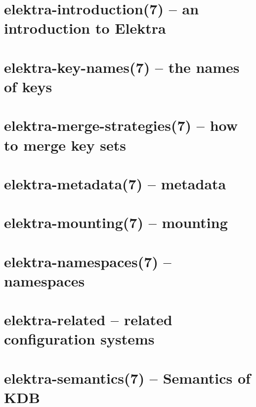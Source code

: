\let\mypdfximage\pdfximage\def\pdfximage{\immediate\mypdfximage}\documentclass[twoside]{book}
\newcommand{\+}{\discretionary{\mbox{\scriptsize$\hookleftarrow$}}{}{}}
\begin{document}
\chapter{elektra-\/introduction(7) -- an introduction to Elektra}
\label{doc_help_elektra-introduction_md}

\chapter{elektra-\/key-\/names(7) -- the names of keys}
\label{doc_help_elektra-key-names_md}

\chapter{elektra-\/merge-\/strategies(7) -- how to merge key sets}
\label{doc_help_elektra-merge-strategy_md}

\chapter{elektra-\/metadata(7) -- metadata}
\label{doc_help_elektra-metadata_md}

\chapter{elektra-\/mounting(7) -- mounting}
\label{doc_help_elektra-mounting_md}

\chapter{elektra-\/namespaces(7) -- namespaces}
\label{doc_help_elektra-namespaces_md}

\chapter{elektra-\/related -- related configuration systems}
\label{doc_help_elektra-related_md}

\chapter{elektra-\/semantics(7) -- Semantics of KDB}
\label{doc_help_elektra-semantics_md}

\end{document}
